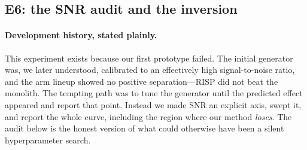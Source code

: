 \documentclass[11pt,a4paper]{article}
\theoremstyle{definition}
\theoremstyle{plain}
\begin{document}
\subsection{E6: the SNR audit and the inversion}
\label{sec:dd5-e6}

\paragraph{Development history, stated plainly.} This experiment exists
because our first prototype failed. The initial generator was, we later
understood, calibrated to an effectively high signal-to-noise ratio, and
the arm lineup showed no positive separation---RISP did not beat the
monolith. The tempting path was to tune the generator until the predicted
effect appeared and report that point. Instead we made SNR an explicit
axis, swept it, and report the whole curve, including the region where our
method \emph{loses}. The audit below is the honest version of what could
otherwise have been a silent hyperparameter search.
\end{document}
